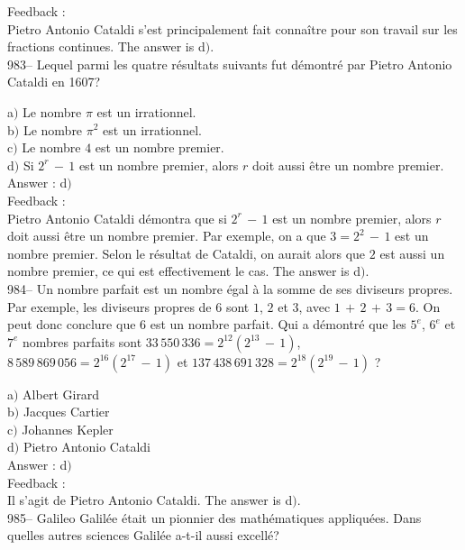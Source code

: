 ﻿\documentclass[letterpaper, 12pt]{article}
\begin{document}
Feedback : \\
Pietro Antonio Cataldi s'est principalement fait conna\^itre pour son
travail sur les fractions continues. The answer is d$)$.\\

983-- Lequel parmi les quatre r\'esultats suivants fut d\'emontr\'e
par Pietro Antonio Cataldi en 1607?

a$)$ Le nombre $\pi$ est un irrationnel. \\
b$)$ Le nombre $\pi^2$ est un irrationnel. \\
c$)$ Le nombre $4$ est un nombre premier. \\
d$)$ Si $2^r\,-\,1$ est un nombre premier, alors $r$ doit aussi \^etre un
nombre premier.\\

Answer : d$)$\\

Feedback : \\
Pietro Antonio Cataldi d\'emontra que si $2^r\,-\,1$ est un nombre
premier, alors $r$ doit aussi \^etre un nombre premier. Par exemple,
on a que $3=2^2\,-\,1$ est un nombre premier. Selon le r\'esultat de
Cataldi, on aurait alors que $2$ est aussi un nombre premier, ce qui
est effectivement le cas.
The answer is d$)$.\\

984-- Un nombre parfait est un nombre \'egal \`a la somme de ses
diviseurs propres. Par exemple, les diviseurs propres de $6$ sont
$1$, $2$ et $3$, avec $1\,+\,2\,+\,3=6$. On peut donc conclure que
$6$ est un nombre parfait. Qui a d\'emontr\'e que les $5^e$, $6^e$
et $7^e$ nombres parfaits sont $33\,550\,336=2^{12}(2^{13}\,-\,1)$,
$8\,589\,869\,056=2^{16}(2^{17}\,-\,1)$ et
$137\,438\,691\,328=2^{18}(2^{19}\,-\,1)$ ?

a$)$ Albert Girard\\
b$)$ Jacques Cartier \\
c$)$ Johannes Kepler \\
d$)$ Pietro Antonio Cataldi\\

Answer : d$)$\\

Feedback : \\
Il s'agit de Pietro Antonio Cataldi. The answer is d$)$.\\

985-- Galileo Galil\'ee \'etait un pionnier des math\'ematiques
appliqu\'ees. Dans quelles autres sciences Galil\'ee a-t-il aussi
excell\'e?
\end{document}
